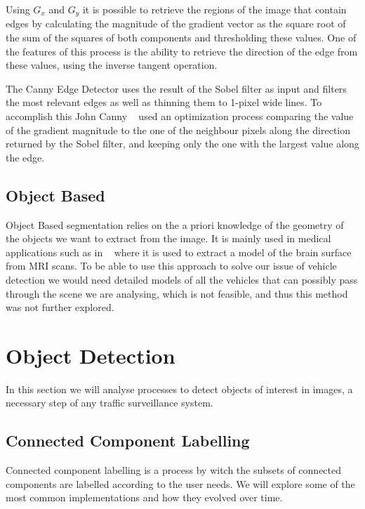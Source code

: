 Using $G_{x}$ and $G_{y}$ it is possible to retrieve the regions of the image that contain edges by calculating the magnitude of the gradient vector as the square root of the sum of the squares of both components and thresholding these values. One of the features of this process is the ability to retrieve the direction of the edge from these values, using the inverse tangent operation.

The Canny Edge Detector uses the result of the Sobel filter as input and filters the most relevant edges as well as thinning them to 1-pixel wide lines. To accomplish this John Canny ~\cite{canny_computational_1986} used an optimization process comparing the value of the gradient magnitude to the one of the neighbour pixels along the direction returned by the Sobel filter, and keeping only the one with the largest value along the edge.

\subsection{Object Based}

Object Based segmentation relies on the a priori knowledge of the geometry of the objects we want to extract from the image. It is mainly used in medical applications such as in ~\cite{snell_model-based_1993} where it is used to extract a model of the brain surface from MRI scans. To be able to use this approach to solve our issue of vehicle detection we would need detailed models of all the vehicles that can possibly pass through the scene we are analysing, which is not feasible, and thus this method was not further explored.

\section{Object Detection}

In this section we will analyse processes to detect objects of interest in images, a necessary step of any traffic surveillance system.

\subsection{Connected Component Labelling}

Connected component labelling is a process by witch the subsets of connected components are labelled according to the user needs. We will explore some of the most common implementations and how they evolved over time.

